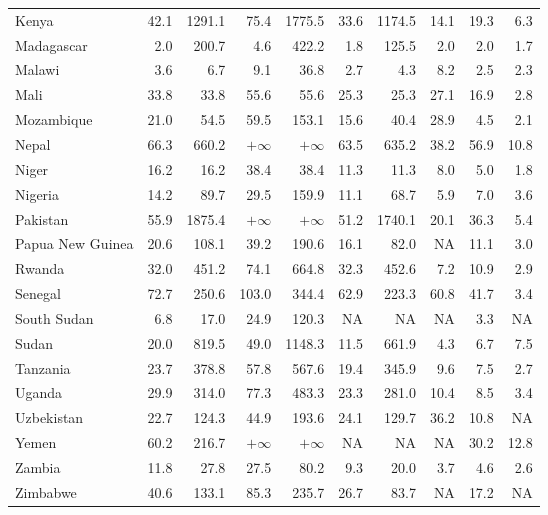 \begin{table}[b]
{\begin{tabular}[t]{lrrrrrrrrr}
Kenya & 42.1 & 1291.1 & 75.4 & 1775.5 & 33.6 & 1174.5 & 14.1 & 19.3 & 6.3\\
Madagascar & 2.0 & 200.7 & 4.6 & 422.2 & 1.8 & 125.5 & 2.0 & 2.0 & 1.7\\
Malawi & 3.6 & 6.7 & 9.1 & 36.8 & 2.7 & 4.3 & 8.2 & 2.5 & 2.3\\
Mali & 33.8 & 33.8 & 55.6 & 55.6 & 25.3 & 25.3 & 27.1 & 16.9 & 2.8\\
Mozambique & 21.0 & 54.5 & 59.5 & 153.1 & 15.6 & 40.4 & 28.9 & 4.5 & 2.1\\
Nepal & 66.3 & 660.2 & $+\infty$ & $+\infty$ & 63.5 & 635.2 & 38.2 & 56.9 & 10.8\\
Niger & 16.2 & 16.2 & 38.4 & 38.4 & 11.3 & 11.3 & 8.0 & 5.0 & 1.8\\
Nigeria & 14.2 & 89.7 & 29.5 & 159.9 & 11.1 & 68.7 & 5.9 & 7.0 & 3.6\\
Pakistan & 55.9 & 1875.4 & $+\infty$ & $+\infty$ & 51.2 & 1740.1 & 20.1 & 36.3 & 5.4\\
Papua New Guinea & 20.6 & 108.1 & 39.2 & 190.6 & 16.1 & 82.0 & NA & 11.1 & 3.0\\
Rwanda & 32.0 & 451.2 & 74.1 & 664.8 & 32.3 & 452.6 & 7.2 & 10.9 & 2.9\\
Senegal & 72.7 & 250.6 & 103.0 & 344.4 & 62.9 & 223.3 & 60.8 & 41.7 & 3.4\\
South Sudan & 6.8 & 17.0 & 24.9 & 120.3 & NA & NA & NA & 3.3 & NA\\
Sudan & 20.0 & 819.5 & 49.0 & 1148.3 & 11.5 & 661.9 & 4.3 & 6.7 & 7.5\\
Tanzania & 23.7 & 378.8 & 57.8 & 567.6 & 19.4 & 345.9 & 9.6 & 7.5 & 2.7\\
Uganda & 29.9 & 314.0 & 77.3 & 483.3 & 23.3 & 281.0 & 10.4 & 8.5 & 3.4\\
Uzbekistan & 22.7 & 124.3 & 44.9 & 193.6 & 24.1 & 129.7 & 36.2 & 10.8 & NA\\
Yemen & 60.2 & 216.7 & $+\infty$ & $+\infty$ & NA & NA & NA & 30.2 & 12.8\\
Zambia & 11.8 & 27.8 & 27.5 & 80.2 & 9.3 & 20.0 & 3.7 & 4.6 & 2.6\\
Zimbabwe & 40.6 & 133.1 & 85.3 & 235.7 & 26.7 & 83.7 & NA & 17.2 & NA\\
\bottomrule
\end{tabular}}
\end{table}